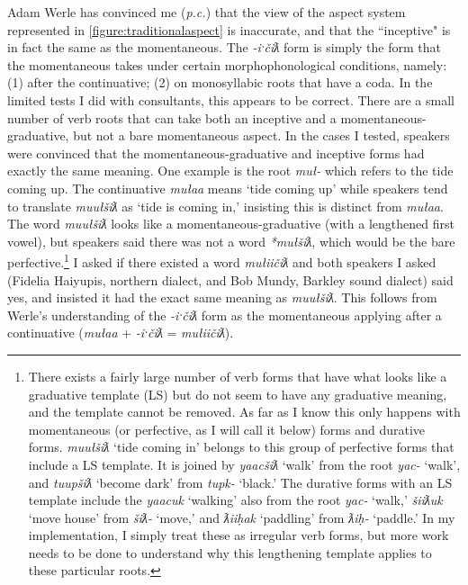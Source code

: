 Adam Werle has convinced me (\textit{p.c.}) that the view of the aspect system represented in \cref{figure:traditionalaspect} is inaccurate, and that the ``inceptive" is in fact the same as the momentaneous. The \textit{-iˑčiƛ} form is simply the form that the momentaneous takes under certain morphophonological conditions, namely: (1) after the continuative; (2) on monosyllabic roots that have a coda. In the limited tests I did with consultants, this appears to be correct. There are a small number of verb roots that can take both an inceptive and a momentaneous-graduative, but not a bare momentaneous aspect. In the cases I tested, speakers were convinced that the momentaneous-graduative and inceptive forms had exactly the same meaning. One example is the root \textit{muł-} which refers to the tide coming up. The continuative \textit{mułaa} means `tide coming up' while speakers tend to translate \textit{muułšiƛ} as `tide is coming in,' insisting this is distinct from \textit{mułaa}. The word \textit{muułšiƛ} looks like a momentaneous-graduative (with a lengthened first vowel), but speakers said there was not a word \textit{*mułšiƛ}, which would be the bare perfective.\footnote{There exists a fairly large number of verb forms that have what looks like a graduative template (LS) but do not seem to have any graduative meaning, and the template cannot be removed. As far as I know this only happens with momentaneous (or perfective, as I will call it below) forms and durative forms. \textit{muułšiƛ} `tide coming in' belongs to this group of perfective forms that include a LS template. It is joined by \textit{yaacšiƛ} `walk' from the root \textit{yac-} `walk', and \textit{tuupšiƛ} `become dark' from \textit{tupk-} `black.' The durative forms with an LS template include the \textit{yaacuk} `walking' also from the root \textit{yac-} `walk,' \textit{šiiƛuk} `move house' from \textit{šiƛ-} `move,' and \textit{ƛiiḥak} `paddling' from \textit{ƛiḥ-} `paddle.' In my implementation, I simply treat these as irregular verb forms, but more work needs to be done to understand why this lengthening template applies to these particular roots.} I asked if there existed a word \textit{mułiičiƛ} and both speakers I asked (Fidelia Haiyupis, northern dialect, and Bob Mundy, Barkley sound dialect) said yes, and insisted it had the exact same meaning as \textit{muułšiƛ}. This follows from Werle's understanding of the \textit{-iˑčiƛ} form as the momentaneous applying after a continuative (\textit{mułaa} + \textit{-iˑčiƛ} = \textit{mułiičiƛ}).

